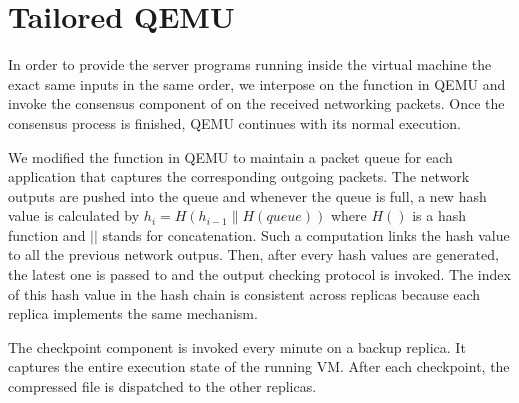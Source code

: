 \section{Tailored QEMU} \label{sec:qemu}

In order to provide the server programs running inside the virtual machine the exact same 
inputs in the same order, we interpose on the \tapsend function in QEMU and invoke the 
\paxos consensus component of \smrsystem on the received networking packets. Once the 
consensus process is finished, QEMU continues with its normal execution. 

We modified the \taprecv function in QEMU to maintain a packet queue for each application 
that captures the corresponding outgoing packets. The network outputs are pushed into the 
queue and whenever the queue is full, a new hash value is calculated by 
$h_i=H(h_{i-1}\|H(queue))$ where $H()$ is a hash function and $||$ stands for concatenation. 
Such a computation links the hash value to all the previous network outpus. Then, after every 
\thashcomp hash values are generated, the latest one is passed to \smrsystem and the output 
checking protocol is invoked. The index of this hash value in the hash chain is 
consistent across replicas because each replica implements the same mechanism. 


The checkpoint component is invoked every minute on a backup replica. It captures the entire 
execution state of the running VM. After each checkpoint, the compressed file is dispatched 
to the other replicas. 
